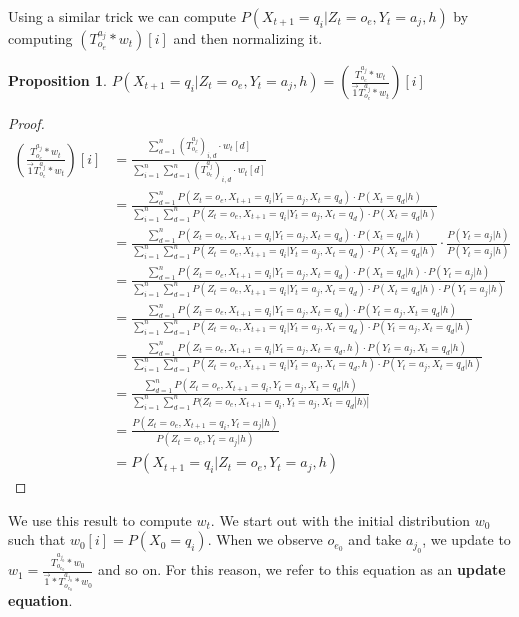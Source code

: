 \documentclass{article}
\newtheorem{prop}{Proposition}
\theoremstyle{definition}
\begin{document}
Using a similar trick we can compute $P(X_{t+1}=q_i|Z_t=o_e,Y_t=a_j,h)$ by computing $(T^{a_j}_{o_e}*w_t)[i]$ and then normalizing it.
\begin{prop}
$P(X_{t+1}=q_i|Z_t=o_e,Y_t=a_j,h)=(\frac{T^{a_j}_{o_e}*w_t}{\vec{1}T^{a_j}_{o_e}*w_t})[i]$
\end{prop}
\begin{proof}
\begin{align*}
(\frac{T^{a_j}_{o_e}*w_t}{\vec{1}T^{a_j}_{o_e}*w_t})[i]&=\frac{\sum\limits_{d=1}^{n} (T^{a_j}_{o_e})_{i,d}\cdot w_t[d]}{\sum\limits_{i=1}^n\sum\limits_{d=1}^{n} (T^{a_j}_{o_e})_{i,d}\cdot w_t[d]} \\
&=\frac{\sum\limits_{d=1}^{n} P(Z_t=o_e,X_{t+1}=q_i|Y_t=a_j,X_t=q_d)\cdot P(X_t=q_d|h)}{\sum\limits_{i=1}^n\sum\limits_{d=1}^{n} P(Z_t=o_e,X_{t+1}=q_i|Y_t=a_j,X_t=q_d)\cdot P(X_t=q_d|h)} \\
&=\frac{\sum\limits_{d=1}^{n} P(Z_t=o_e,X_{t+1}=q_i|Y_t=a_j,X_t=q_d)\cdot P(X_t=q_d|h)}{\sum\limits_{i=1}^n\sum\limits_{d=1}^{n} P(Z_t=o_e,X_{t+1}=q_i|Y_t=a_j,X_t=q_d)\cdot P(X_t=q_d|h)}\cdot \frac{P(Y_t=a_j|h)}{P(Y_t=a_j|h)} \\
&=\frac{\sum\limits_{d=1}^{n} P(Z_t=o_e,X_{t+1}=q_i|Y_t=a_j,X_t=q_d)\cdot P(X_t=q_d|h)\cdot P(Y_t=a_j|h)}{\sum\limits_{i=1}^n\sum\limits_{d=1}^{n} P(Z_t=o_e,X_{t+1}=q_i|Y_t=a_j,X_t=q_d)\cdot P(X_t=q_d|h)\cdot P(Y_t=a_j|h)} \\
&=\frac{\sum\limits_{d=1}^{n} P(Z_t=o_e,X_{t+1}=q_i|Y_t=a_j,X_t=q_d)\cdot P(Y_t=a_j,X_t=q_d|h)}{\sum\limits_{i=1}^n\sum\limits_{d=1}^{n} P(Z_t=o_e,X_{t+1}=q_i|Y_t=a_j,X_t=q_d)\cdot P(Y_t=a_j,X_t=q_d|h)} \\
&=\frac{\sum\limits_{d=1}^{n} P(Z_t=o_e,X_{t+1}=q_i|Y_t=a_j,X_t=q_d,h)\cdot P(Y_t=a_j,X_t=q_d|h)}{\sum\limits_{i=1}^n\sum\limits_{d=1}^{n} P(Z_t=o_e,X_{t+1}=q_i|Y_t=a_j,X_t=q_d,h)\cdot P(Y_t=a_j,X_t=q_d|h)} \\
&=\frac{\sum\limits_{d=1}^{n} P(Z_t=o_e,X_{t+1}=q_i,Y_t=a_j,X_t=q_d|h)}{\sum\limits_{i=1}^{n} \sum\limits_{d=1}^{n} P(Z_t=o_e,X_{t+1}=q_i,Y_t=a_j,X_t=q_d|h)|} \\
&=\frac{P(Z_t=o_e,X_{t+1}=q_i,Y_t=a_j|h)}{P(Z_t=o_e,Y_t=a_j|h)} \\
&=P(X_{t+1}=q_i|Z_t=o_e,Y_t=a_j,h)
\end{align*}
\end{proof}
We use this result to compute $w_t$. We start out with the initial distribution $w_0$ such that $w_0[i]=P(X_0=q_i)$. When we observe $o_{e_0}$ and take $a_{j_0}$, we update to $w_1=\frac{T^{a_{j_0}}_{o_{e_0}}*w_0}{\vec{1}*T^{a_{j_0}}_{o_{e_0}}*w_0}$ and so on. For this reason, we refer to this equation as an {\textbf{update equation}}. 
\end{document}
